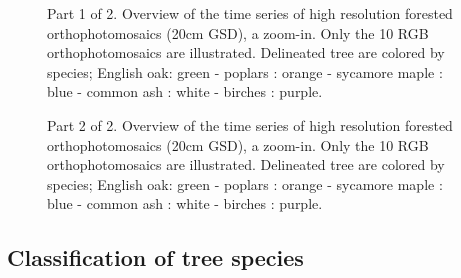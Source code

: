 \documentclass[remotesensing,article,submit,moreauthors,pdftex,12pt,a4paper]{mdpi} %
\begin{document}
\begin{figure}[H]
\centering
\captionsetup[subfigure]{labelformat=empty,singlelinecheck=true,margin=0pt, parskip=0pt,
hangindent=0pt, indention=0pt}
\hspace{5mm}
\hspace{0.05mm}
\hspace{5mm}
\hspace{0.05mm}
\hspace{5mm}
\hspace{0.05mm}
\caption{ Part 1 of 2. Overview of the time series of high resolution forested orthophotomosaics (20cm GSD), a zoom-in. Only the 10 RGB orthophotomosaics are illustrated. Delineated tree are colored by species; English oak: green - poplars : orange - sycamore maple : blue - common ash : white - birches : purple.}
\label{fig:TS_zoomin}
\end{figure}

\begin{figure}[H]
\centering
\captionsetup[subfigure]{labelformat=empty,singlelinecheck=true,margin=0pt, parskip=0pt,
hangindent=0pt, indention=0pt}
\ContinuedFloat 
{}\hspace{5mm}
\hspace{0.05mm}
\hspace{5mm}
\hspace{0.05mm}
\caption{Part 2 of 2. Overview of the time series of high resolution forested orthophotomosaics (20cm GSD), a zoom-in. Only the 10 RGB orthophotomosaics are illustrated. Delineated tree are colored by species; English oak: green - poplars : orange - sycamore maple : blue - common ash : white - birches : purple.}
\label{fig:TS_zoomin}
\end{figure}

\subsection{Classification of tree species}
\end{document}
